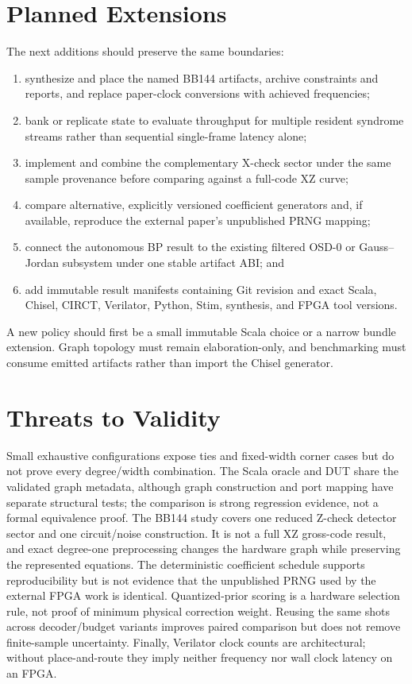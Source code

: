 \documentclass[10pt,conference]{IEEEtran}
\begin{document}
\section{Planned Extensions}
The next additions should preserve the same boundaries:
\begin{enumerate}
  \item synthesize and place the named BB144 artifacts, archive constraints and
        reports, and replace paper-clock conversions with achieved frequencies;
  \item bank or replicate state to evaluate throughput for multiple resident
        syndrome streams rather than sequential single-frame latency alone;
  \item implement and combine the complementary X-check sector under the same
        sample provenance before comparing against a full-code XZ curve;
  \item compare alternative, explicitly versioned coefficient generators and,
        if available, reproduce the external paper's unpublished PRNG mapping;
  \item connect the autonomous BP result to the existing filtered OSD-0 or
        Gauss--Jordan subsystem under one stable artifact ABI; and
  \item add immutable result manifests containing Git revision and exact Scala,
        Chisel, CIRCT, Verilator, Python, Stim, synthesis, and FPGA tool versions.
\end{enumerate}
A new policy should first be a small immutable Scala choice or a narrow bundle
extension.  Graph topology must remain elaboration-only, and benchmarking must
consume emitted artifacts rather than import the Chisel generator.

\section{Threats to Validity}
Small exhaustive configurations expose ties and fixed-width corner cases but do
not prove every degree/width combination.  The Scala oracle and DUT share the
validated graph metadata, although graph construction and port mapping have
separate structural tests; the comparison is strong regression evidence, not a
formal equivalence proof.  The BB144 study covers one reduced Z-check detector
sector and one circuit/noise construction.  It is not a full XZ gross-code
result, and exact degree-one preprocessing changes the hardware graph while
preserving the represented equations.  The deterministic coefficient schedule
supports reproducibility but is not evidence that the unpublished PRNG used by
the external FPGA work is identical.  Quantized-prior scoring is a hardware
selection rule, not proof of minimum physical correction weight.  Reusing the
same shots across decoder/budget variants improves paired comparison but does
not remove finite-sample uncertainty.  Finally, Verilator clock counts are
architectural; without place-and-route they imply neither frequency nor wall
clock latency on an FPGA.
\end{document}
